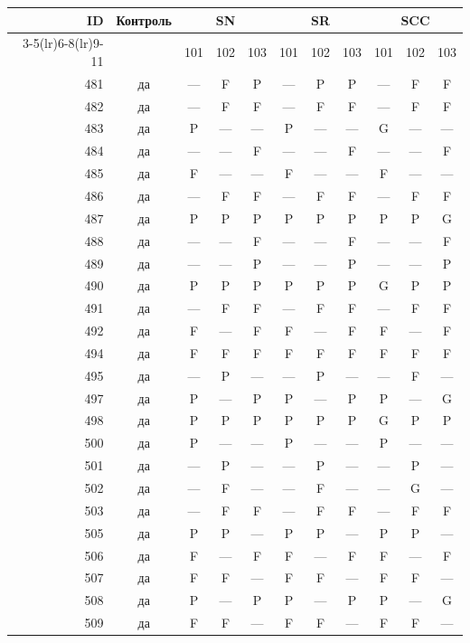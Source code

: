 \begin{table}[p]\centering\small
\begin{tabular*}{\textwidth}{@{\extracolsep{\fill}}rc*{9}{c}@{}}\toprule
ID & Контроль & \multicolumn{3}{c}{SN} & \multicolumn{3}{c}{SR} & \multicolumn{3}{c}{SCC}\\
\cmidrule(lr){3-5}\cmidrule(lr){6-8}\cmidrule(lr){9-11}
 & & 101 & 102 & 103 & 101 & 102 & 103 & 101 & 102 & 103\\\midrule
481 & да & — & F & P & — & P & P & — & F & F\\
482 & да & — & F & F & — & F & F & — & F & F\\
483 & да & P & — & — & P & — & — & G & — & —\\
484 & да & — & — & F & — & — & F & — & — & F\\
485 & да & F & — & — & F & — & — & F & — & —\\
486 & да & — & F & F & — & F & F & — & F & F\\
487 & да & P & P & P & P & P & P & P & P & G\\
488 & да & — & — & F & — & — & F & — & — & F\\
489 & да & — & — & P & — & — & P & — & — & P\\
490 & да & P & P & P & P & P & P & G & P & P\\
491 & да & — & F & F & — & F & F & — & F & F\\
492 & да & F & — & F & F & — & F & F & — & F\\
494 & да & F & F & F & F & F & F & F & F & F\\
495 & да & — & P & — & — & P & — & — & F & —\\
497 & да & P & — & P & P & — & P & P & — & G\\
498 & да & P & P & P & P & P & P & G & P & P\\
500 & да & P & — & — & P & — & — & P & — & —\\
501 & да & — & P & — & — & P & — & — & P & —\\
502 & да & — & F & — & — & F & — & — & G & —\\
503 & да & — & F & F & — & F & F & — & F & F\\
505 & да & P & P & — & P & P & — & P & P & —\\
506 & да & F & — & F & F & — & F & F & — & F\\
507 & да & F & F & — & F & F & — & F & F & —\\
508 & да & P & — & P & P & — & P & P & — & G\\
509 & да & F & F & — & F & F & — & F & F & —\\

\end{tabular*}
\end{table}
